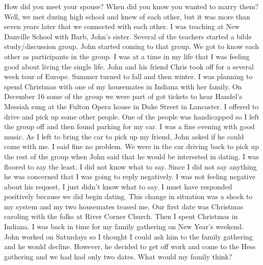 How did you meet your spouse? When did you know you wanted to marry them?
Well, we met during high school and knew of each other, but it was more than seven years later that we connected with each other. I was teaching at New Danville School with Barb, John's sister. Several of the teachers started a bible study/discussion group. John started coming to that group. We got to know each other as participants in the group. I was at a time in my life that I was feeling good about living the single life. John and his friend Chris took off for a several week tour of Europe. Summer turned to fall and then winter. I was planning to spend Christmas with one of my housemates in Indiana with her family. On December 16 some of the group we were part of got tickets to hear Handel's Messiah sung at the Fulton Opera house in Duke Street in Lancaster. I offered to drive and pick up some other people. One of the people was handicapped so I left the group off and then found parking for my car. I was a fine evening with good music. As I left to bring the car to pick up my friend, John asked if he could come with me. I said fine no problem. We were in the car driving back to pick up the rest of the group when John said that he would be interested in dating. I was floored to say the least. I did not know what to say. Since I did not say anything he was concerned that I was going to reply negatively. I was not feeling negative about his request, I just didn't know what to say. I must have responded positively because we did begin dating. This change in situation was a shock to my system and my two housemates teased me. Our first date was Christmas caroling with the folks at River Corner Church. Then I spent Christmas in Indiana. I was back in time for my family gathering on New Year's weekend. John worked on Saturdays so I thought I could ask him to the family gathering and he would decline. However, he decided to get off work and come to the Hess gathering and we had had only two dates. What would my family think?
